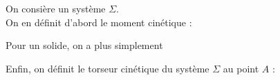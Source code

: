 ﻿\documentclass[a4paper]{article}
\begin{document}
\pagestyle{fancy}
\fancyhf{}
\setlength{\headheight}{15pt}

\begin{center}
	\large{}
\end{center}


On consière un système \( \Sigma \). \\
On en définit d'abord le moment cinétique :
\begin{center}
\end{center}

Pour un solide, on a plus simplement
\begin{center}
\end{center}

Enfin, on définit le torseur cinétique du système \( \Sigma \) au point $A$ :
\begin{center}
\end{center}
\end{document}
